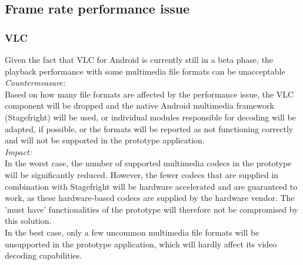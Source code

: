 \subsection{Frame rate performance issue}
\subsubsection{VLC}
Given the fact that VLC for Android is currently still in a beta phase, the playback performance with some multimedia file formats can be unacceptable\\
\newline
\textit{Countermeasure:}\\
Based on how many file formats are affected by the performance issue, the VLC component will be dropped and the native Android multimedia framework (Stagefright) will be used, or individual modules responsible for decoding will be adapted, if possible, or the formats will be reported as not functioning correctly and will not be supported in the prototype application.\\
\newline
\textit{Impact:}\\
In the worst case, the number of supported multimedia codecs in the prototype will be significantly reduced. However, the fewer codecs that are supplied in combination with Stagefright will be hardware accelerated and are guaranteed to work, as these hardware-based codecs are supplied by the hardware vendor. The 'must have' functionalities of the prototype will therefore not be compromised by this solution.\\
\newline
In the best case, only a few uncommon multimedia file formats will be unsupported in the prototype application, which will hardly affect its video decoding capabilities.